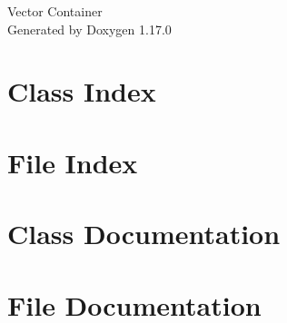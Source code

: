 \documentclass[twoside]{book}
\newcommand{\+}{\discretionary{\mbox{\scriptsize$\hookleftarrow$}}{}{}}
\newcommand{\clearemptydoublepage}{%
    \newpage{\pagestyle{empty}\cleardoublepage}%
  }
\begin{document}
  \raggedbottom
    \hypersetup{pageanchor=false,
                bookmarksnumbered=true,
                pdfencoding=unicode
               }
  \begin{titlepage}
  \vspace*{7cm}
  \begin{center}%
  {\Large Vector Container}\\
  \vspace*{1cm}
  {\large Generated by Doxygen 1.17.0}\\
  \end{center}
  \end{titlepage}
  \clearemptydoublepage
  \tableofcontents
  \clearemptydoublepage
  \hypersetup{pageanchor=true}
\chapter{Class Index}

\chapter{File Index}

\chapter{Class Documentation}

\chapter{File Documentation}


  \backmatter
  \newpage
  \clearemptydoublepage
  \printindex
\end{document}
